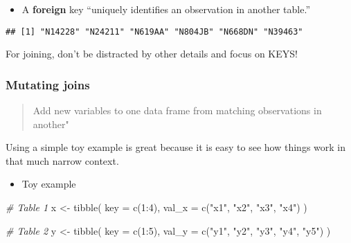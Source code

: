 \documentclass[
]{book}
\newenvironment{Shaded}{\begin{snugshade}}{\end{snugshade}}
\newcommand{\AttributeTok}[1]{\textcolor[rgb]{0.77,0.63,0.00}{#1}}
\newcommand{\CommentTok}[1]{\textcolor[rgb]{0.56,0.35,0.01}{\textit{#1}}}
\newcommand{\DecValTok}[1]{\textcolor[rgb]{0.00,0.00,0.81}{#1}}
\newcommand{\FunctionTok}[1]{\textcolor[rgb]{0.00,0.00,0.00}{#1}}
\newcommand{\NormalTok}[1]{#1}
\newcommand{\OtherTok}[1]{\textcolor[rgb]{0.56,0.35,0.01}{#1}}
\newcommand{\SpecialCharTok}[1]{\textcolor[rgb]{0.00,0.00,0.00}{#1}}
\newcommand{\StringTok}[1]{\textcolor[rgb]{0.31,0.60,0.02}{#1}}
\providecommand{\tightlist}{%
  \setlength{\itemsep}{0pt}\setlength{\parskip}{0pt}}
\begin{document}
\begin{itemize}
\tightlist
\item
  A \textbf{foreign} key ``uniquely identifies an observation in another table.''
\end{itemize}

\begin{Shaded}
\end{Shaded}

\begin{verbatim}
## [1] "N14228" "N24211" "N619AA" "N804JB" "N668DN" "N39463"
\end{verbatim}

For joining, don't be distracted by other details and focus on KEYS!

\hypertarget{mutating-joins}{%
\subsubsection{Mutating joins}\label{mutating-joins}}

\begin{quote}
Add new variables to one data frame from matching observations in another"
\end{quote}

Using a simple toy example is great because it is easy to see how things work in that much narrow context.

\begin{itemize}
\tightlist
\item
  Toy example
\end{itemize}

\begin{Shaded}
\begin{Highlighting}[]
\CommentTok{\# Table 1}
\NormalTok{x }\OtherTok{\textless{}{-}} \FunctionTok{tibble}\NormalTok{(}
  \AttributeTok{key =} \FunctionTok{c}\NormalTok{(}\DecValTok{1}\SpecialCharTok{:}\DecValTok{4}\NormalTok{),}
  \AttributeTok{val\_x =} \FunctionTok{c}\NormalTok{(}\StringTok{"x1"}\NormalTok{, }\StringTok{"x2"}\NormalTok{, }\StringTok{"x3"}\NormalTok{, }\StringTok{"x4"}\NormalTok{)}
\NormalTok{)}

\CommentTok{\# Table 2}
\NormalTok{y }\OtherTok{\textless{}{-}} \FunctionTok{tibble}\NormalTok{(}
  \AttributeTok{key =} \FunctionTok{c}\NormalTok{(}\DecValTok{1}\SpecialCharTok{:}\DecValTok{5}\NormalTok{),}
  \AttributeTok{val\_y =} \FunctionTok{c}\NormalTok{(}\StringTok{"y1"}\NormalTok{, }\StringTok{"y2"}\NormalTok{, }\StringTok{"y3"}\NormalTok{, }\StringTok{"y4"}\NormalTok{, }\StringTok{"y5"}\NormalTok{)}
\NormalTok{)}
\end{Highlighting}
\end{Shaded}
\end{document}
